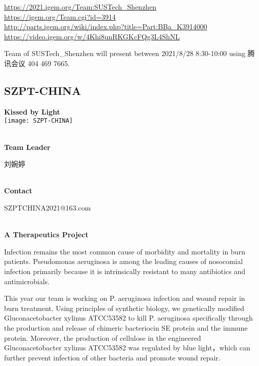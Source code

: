 \url{https://2021.igem.org/Team:SUSTech\_Shenzhen }\\
\url{https://igem.org/Team.cgi?id=3914 }\\
\url{http://parts.igem.org/wiki/index.php?title=Part:BBa_K3914000 }\\
\url{https://video.igem.org/w/4Khi8unRKGKcFQg3L4ShNL }\\

\vfill{}









Team of SUSTech\_Shenzhen will present between    2021/8/28 8:30-10:00     using 腾讯会议 404 469 7665.
\newpage


\subsection{\textcolor{Blu}{ SZPT-CHINA } }
\vspace{5mm}
\begin{center}
\large{
  \textbf{ Kissed by Light }\\
  \texttt{[image: SZPT-CHINA]}
}
\end{center}
\textbf{\\Team Leader}

  刘婉婷


\textbf{\\Contact}

  SZPTCHINA2021@163.com


\textbf{\\A Therapeutics Project\\}\begin{spacing}{1.5}

Infection remains the most common cause of morbidity and mortality in burn patients. Pseudomonas aeruginosa is among the leading causes of nosocomial infection primarily because it is intrinsically resistant to many antibiotics and antimicrobials.

This year our team is working on P. aeruginosa infection and wound repair in burn treatment. Using principles of synthetic biology, we genetically modified Gluconacetobacter xylinus ATCC53582 to kill P. aeruginosa specifically through the production and release of chimeric bacteriocin SE protein and the immune protein. Moreover, the production of cellulose in the engineered Gluconacetobacter xylinus ATCC53582 was regulated by blue light，which can further prevent infection of other bacteria and promote wound repair.\end{spacing}
\\

